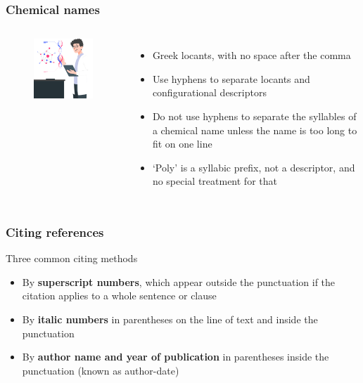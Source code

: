 \documentclass[newPxFont,sthlmFooter]{beamer}
\newcommand{\fs}{\footnotesize}
\begin{document}

\begin{frame}\frametitle{Chemical names}
  \begin{columns}[T,onlytextwidth]
  \begin{figure}
    \centering
    \includegraphics[width=2in]{figs/chem} 
  \end{figure}
      \vspace{0.3cm}
  \begin{itemize}
  \fs
  \item Greek locants, with no space after the comma
  \item Use hyphens to separate locants and configurational descriptors
  \item Do not use hyphens to separate the syllables of a chemical name unless the name is too long to fit on one line
  \item `Poly' is a syllabic prefix, not a descriptor, and no special treatment for that
  \end{itemize}
  \vspace{-2cm}
  \end{columns}
\end{frame}

\begin{frame}\frametitle{Citing references}
\begin{block}{\small Three common citing methods}
  \begin{itemize}
  \fs
  \item By {\bf superscript numbers}, which appear outside the punctuation if the citation applies to a whole sentence or clause
  \item By {\bf italic numbers} in parentheses on the line of text and inside the punctuation
  \item By {\bf author name and year of publication} in parentheses inside the punctuation (known as author-date)
  \end{itemize}
  \end{block}
\end{frame}
\end{document}

